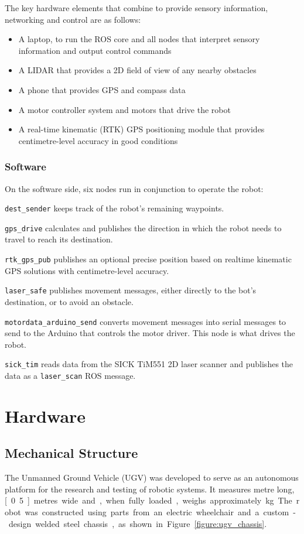 \documentclass[titlepage,12pt,a4paper]{article}
\begin{document}
The key hardware elements that combine to provide sensory information, networking and control are as follows:

\begin{itemize}
	\item A laptop, to run the ROS core and all nodes that interpret sensory information and output control commands
	\item A LIDAR that provides a 2D field of view of any nearby obstacles
	\item A phone that provides GPS and compass data
	\item A motor controller system and motors that drive the robot
	\item A real-time kinematic (RTK) GPS positioning module that provides centimetre-level accuracy in good conditions
\end{itemize}



\subsubsection{Software}

On the software side, six nodes run in conjunction to operate the robot:

\verb|dest_sender| keeps track of the robot's remaining waypoints.

\verb|gps_drive| calculates and publishes the direction in which the robot needs to travel to reach its destination.

\verb|rtk_gps_pub| publishes an optional precise position based on realtime kinematic GPS solutions with centimetre-level accuracy.

\verb|laser_safe| publishes movement messages, either directly to the bot's destination, or to avoid an obstacle.

\verb|motordata_arduino_send| converts movement messages into serial messages to send to the Arduino that controls the motor driver. This node is what drives the robot.

\verb|sick_tim| reads data from the SICK TiM551 2D laser scanner and publishes the data as a \verb|laser_scan| ROS message.

\pagebreak
\section{Hardware}

\subsection{Mechanical Structure}
The Unmanned Ground Vehicle (UGV) was developed to serve as an autonomous platform for the research and testing of robotic systems. It measures \unit[1]{metre} long, \unit[0.5]{metres} wide and, when fully loaded, weighs approximately \unit[50]{kg}. The robot was constructed using parts from an electric wheelchair and a custom-design welded steel chassis, as shown in Figure \ref{figure:ugv_chassis}.
\end{document}
